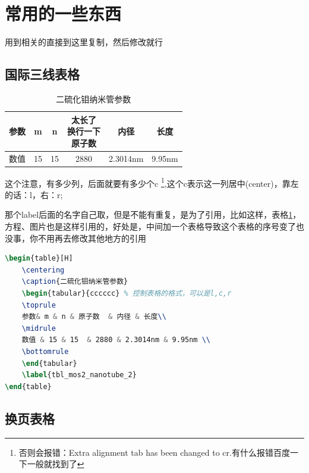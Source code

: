\documentclass[AutoFakeBold]{template/LZUThesis2021_master}
\begin{document}
\section{常用的一些东西} %
\label{sec:常用的一些东西}

用到相关的直接到这里复制，然后修改就行

\subsection{国际三线表格} %
\label{sub:国际三线表格}

\begin{table}[H]
    \centering
    \caption{二硫化钼纳米管参数}
    \begin{tabular}{cccccc} %
    \toprule
    参数& m & n & \tabincell{c}{太长了\\换行一下\\原子数}  & 内径 & 长度\\
    \midrule
    数值 & 15 & 15  & 2880 & 2.3014nm & 9.95nm \\
    \bottomrule
    \end{tabular}
    \label{tbl_mos2_nanotube}
\end{table}

这个注意，有多少列，后面就要有多少个c \footnote{否则会报错：Extra alignment tab has been changed to cr.有什么报错百度一下一般就找到了},这个c表示这一列居中(center)，靠左的话：l，右：r;

那个label后面的名字自己取，但是不能有重复，是为了引用，比如这样，表格\ref{tbl_mos2_nanotube}，方程、图片也是这样引用的，好处是，中间加一个表格导致这个表格的序号变了也没事，你不用再去修改其他地方的引用

\begin{lstlisting}[language = tex]
\begin{table}[H]
    \centering
    \caption{二硫化钼纳米管参数}
    \begin{tabular}{cccccc} % 控制表格的格式，可以是l,c,r
    \toprule
    参数& m & n & 原子数  & 内径 & 长度\\
    \midrule
    数值 & 15 & 15  & 2880 & 2.3014nm & 9.95nm \\
    \bottomrule
    \end{tabular}
    \label{tbl_mos2_nanotube_2}
\end{table}
\end{lstlisting}

\subsection{换页表格} %
\end{document}
